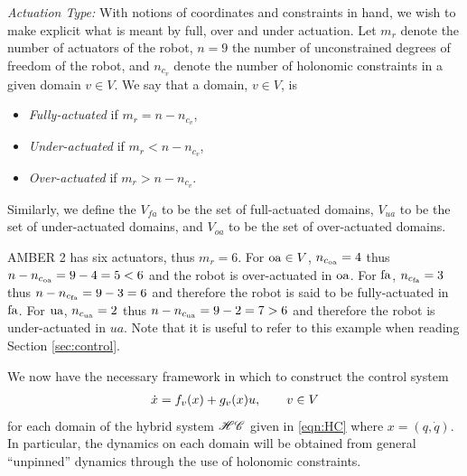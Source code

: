\gap

{\it Actuation Type:}  With notions of coordinates and constraints in hand, we wish to make explicit what is meant by full, over and under actuation. Let $m_r$ denote the number of actuators of the robot, $n = 9$ the number of unconstrained degrees of freedom of the robot, and $n_{c_v}$ denote the number of holonomic constraints in a given domain $v \in V$.  We say that a domain, $v \in V$, is
\begin{itemize}
 \item {\it Fully-actuated} if  $m_r = n - n_{c_v}$,
 \item {\it Under-actuated} if $m_r < n - n_{c_v}$,
 \item {\it Over-actuated} if  $m_r > n - n_{c_v}$. 
\end{itemize}
Similarly, we define the $V_{fa}$ to be the set of full-actuated domains, $V_{ua}$ to be the set of under-actuated domains, and $V_{oa}$ to be the set of over-actuated domains. 

\gap

\begin{myexample}
AMBER 2 has six actuators, thus $m_{r} = 6$. For $\mathrm{oa} \in V$, $n_{c_{\mathrm{oa}}} = 4$ thus $n - n_{c_{\mathrm{oa}}} = 9 - 4 = 5 < 6$ and the robot is over-actuated in $\mathrm{oa}$. For $\mathrm{fa}$, $n_{c_{\mathrm{fa}}} =3$ thus $n - n_{c_{\mathrm{fa}}} = 9 - 3 = 6$ and therefore the robot is said to be fully-actuated in $\mathrm{fa}$. For $\mathrm{ua}$, $n_{c_{\mathrm{ua}}}=2$ thus $n - n_{c_{\mathrm{ua}}} = 9 - 2 = 7>6$ and therefore the robot is under-actuated in $ua$. Note that it is useful to refer to this example when reading Section \ref{sec:control}.
\end{myexample}


 We now have the necessary framework in which to construct the control system 
 \begin{align}
 \label{eqn:fgdyn}
 \dot {x} = f_v(x) + g_v(x) u, \qquad v \in V
 \end{align}
 for each domain of the hybrid system $\mathscr{HC}$ given in \eqref{eqn:HC} where $x = (q,\dot{q})$.  In particular, the dynamics on each domain will be obtained from general ``unpinned'' dynamics through the use of holonomic constraints.

